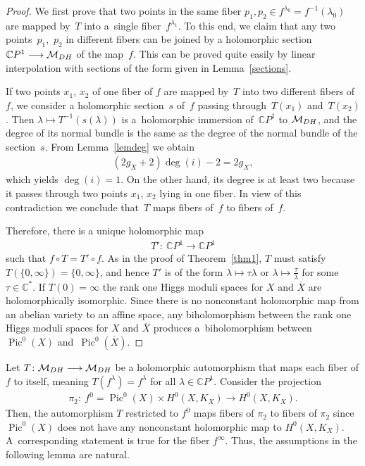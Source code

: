 \documentclass[11pt]{article}
\numberwithin{equation}{section}
\begin{document}
\begin{proof} We f\/irst prove that two points in the same f\/iber $p_1, p_2 \in f^{\lambda_0} = f^{-1}(\lambda_0)$ are mapped by~$T$ into a~single f\/iber~$f^{\lambda_1}$. To this end, we claim that any two points~$p_1$,~$p_2$ in dif\/ferent f\/ibers can be joined by a holomorphic section ${\mathbb C}P^1 \longrightarrow {\mathcal M}_{\rm DH}$ of the map~$f$. This can be proved quite easily by linear interpolation with sections of the form given in Lemma~\ref{sections}.

If two points $x_1$, $x_2$ of one f\/iber of $f$ are mapped by~$T$ into two dif\/ferent f\/ibers of $f$, we consider a holomorphic section~$s$ of~$f$ passing through~$T(x_1)$ and~$T(x_2)$. Then $\lambda \longmapsto T^{-1}(s(\lambda))$ is a~holomorphic immersion of~${\mathbb C}P^1$ to ${\mathcal M}_{\rm DH}$, and the degree of its normal bundle is the same as the degree of the normal bundle of the section~$s$. From Lemma~\ref{lemdeg} we obtain
\begin{gather*}(2 g_X+2)\deg (i)-2=2g_X,\end{gather*}
which yields $\deg (i)=1$. On the other hand, its degree is at least two because it passes through two points $x_1$, $x_2$ lying in one f\/iber. In view of this contradiction we conclude that~$T$ maps f\/ibers of~$f$ to f\/ibers of~$f$.

Therefore, there is a unique holomorphic map
\begin{gather*}T'\colon \ {\mathbb C}P^1 \longrightarrow {\mathbb C}P^1\end{gather*}
such that $f\circ T = T'\circ f$. As in the proof of Theorem~\ref{thm1}, $T$ must satisfy $T(\{0,\infty\}) = \{0,\infty\}$, and hence $T'$ is of the form $\lambda \longmapsto \tau\lambda$ or $\lambda \longmapsto \frac{\tau}{\lambda}$ for some $\tau \in \mathbb C^*$. If $T(0) = \infty$ the rank one Higgs moduli spaces for $X$ and $\overline X$ are holomorphically isomorphic. Since there is no nonconstant holomorphic map from an abelian variety
to an af\/f\/ine space, any biholomorphism between the rank one Higgs moduli spaces for $X$ and $\overline X$ produces a~biholomorphism between~$\operatorname{Pic}^0(X)$ and~$\operatorname{Pic}^0(\overline{X})$.
\end{proof}

Let $T \colon {\mathcal M}_{\rm DH} \longrightarrow {\mathcal M}_{\rm DH}$ be a holomorphic automorphism that maps each f\/iber of $f$ to itself, meaning $T(f^\lambda) = f^\lambda$ for all $\lambda \in {\mathbb C}P^1$. Consider the projection
\begin{gather}\label{pi2}
\pi_2 \colon \ f^0  = \operatorname{Pic}^0(X)\times H^0(X, K_X) \longrightarrow H^0(X, K_X) .
\end{gather}
Then, the automorphism $T$ restricted to $f^0$ maps f\/ibers of $\pi_2$ to f\/ibers of $\pi_2$ since $\operatorname{Pic}^0(X)$ does not have any nonconstant holomorphic map to $H^0(X, K_X)$. A~corresponding statement is true for the f\/iber $f^\infty$. Thus, the assumptions in the following
lemma are natural.
\end{document}
